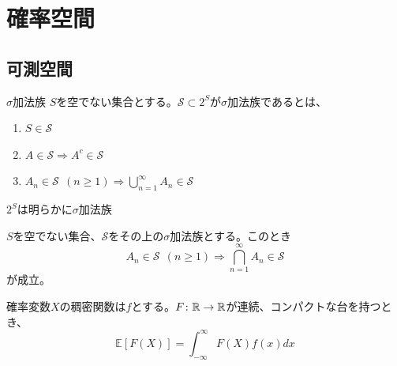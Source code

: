 \documentclass[dvipdfmx, leqno]{jsbook}
\begin{document}
\section{確率空間}
\subsection{可測空間}
\begin{soudef}{$\sigma$加法族}
    $S$を空でない集合とする。$\mathcal{S}\subset 2^S$が$\sigma$加法族であるとは、
\begin{enumerate}
    \item $S\in \mathcal{S}$
    \item $A\in \mathcal{S}\Rightarrow A^c\in \mathcal{S}$
    \item $A_n\in \mathcal{S}\ \ (n\ge 1) \Rightarrow \bigcup_{n= 1}^\infty A_n\in \mathcal{S}$
\end{enumerate}
\end{soudef}

\begin{souexample}
    $2^S$は明らかに$\sigma$加法族
\end{souexample}

\begin{souprop}
    $S$を空でない集合、$\mathcal{S}$をその上の$\sigma$加法族とする。このとき
\begin{equation}
    A_n\in \mathcal{S}\ \ (n\ge 1)\Rightarrow \bigcap_{n= 1}^\infty A_n\in \mathcal{S}
\end{equation}
    が成立。
\end{souprop}
\begin{souremark}
    
\end{souremark}

%
%
%
%
%
%
%
\begin{souprop}
    確率変数$X$の稠密関数は$f$とする。$F\colon \mathbb{R}\to \mathbb{R}$が連続、コンパクトな台を持つとき、
\begin{equation} \label{eq:F:R-> R・連続・コンパクトな台を持つ}
\mathbb{E}[F(X)]= \int_{-\infty}^\infty F(X) f(x)dx
\end{equation}
\end{souprop}
\end{document}
